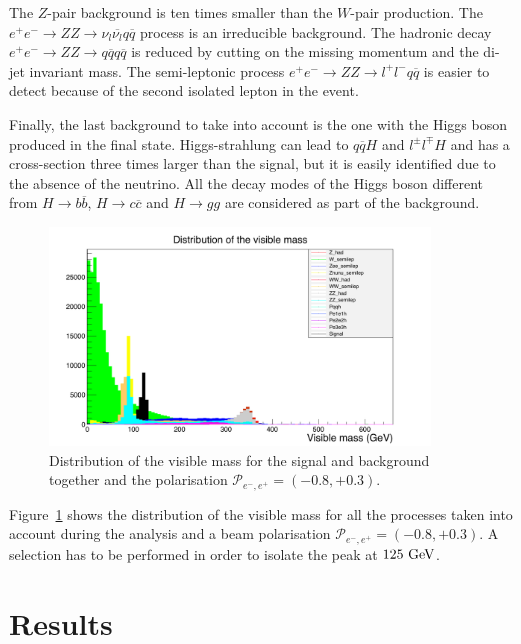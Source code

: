     The $Z$-pair background is ten times smaller than the $W$-pair production.
    The  $e^+e^- \rightarrow ZZ \rightarrow \nu_{l}\overline{\nu_{l}}q \overline{q}$ process is an irreducible background.
    The hadronic decay $e^+e^- \rightarrow ZZ \rightarrow q\overline{q} q\overline{q}$ is reduced by cutting on the missing momentum and the di-jet invariant mass.
    The semi-leptonic process $e^+e^- \rightarrow ZZ \rightarrow l^+l^- q\overline{q}$ is easier to detect because of the second isolated lepton in the event.

    Finally, the last background to take into account is the one with the Higgs boson produced in the final state.
    Higgs-strahlung can lead to $q\overline{q}H$ and $l^{\pm}l^{\mp}H$ and has a cross-section three times larger than the signal, but it is easily identified due to the absence of the neutrino.
    All the decay modes of the Higgs boson different from $H \rightarrow b\overline{b}$, $H \rightarrow c\overline{c}$ and $H \rightarrow gg$ are considered as part of the background.

    \begin{figure}[!tbh]
      \centering
      \includegraphics[width = 0.9\textwidth]{Pictures/Higgs/mVis_all.png}
      \caption{Distribution of the visible mass for the signal and background together and the polarisation $\mathcal{P}_{e^-,e^+} = (-0.8,+0.3)$.}
      \label{fig:mVisAll}
    \end{figure}

    Figure~\ref{fig:mVisAll} shows the distribution of the visible mass for all the processes taken into account during the analysis and a beam polarisation $\mathcal{P}_{e^-,e^+} = (-0.8,+0.3)$.
    A selection has to be performed in order to isolate the peak at $125~\rm{GeV}$.

  \section{Results}
 
